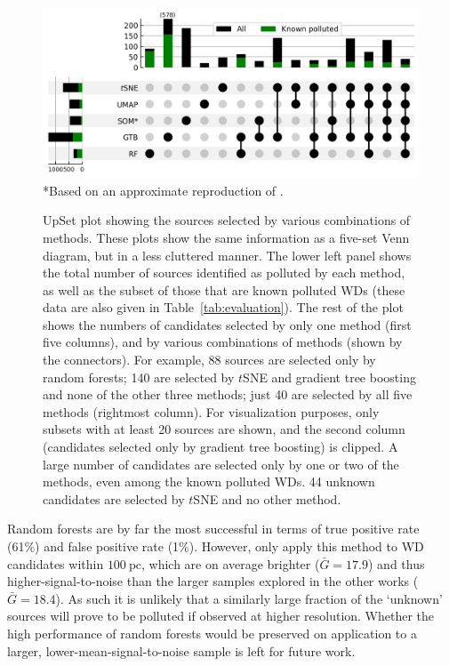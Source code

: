 \documentclass[fleqn,usenatbib]{rasti}
\begin{document}
\begin{figure}
\centering
\includegraphics[width=\textwidth]{figures/fig7_upset.png}
*Based on an approximate reproduction of \citet{perezcouto24}.
\caption{
    UpSet plot \citep{lex14} showing the sources selected by various combinations of methods.
    These plots show the same information as a five-set Venn diagram, but in a less cluttered manner.
    The lower left panel shows the total number of sources identified as polluted by each method, as well as the subset of those that are known polluted WDs (these data are also given in Table~\ref{tab:evaluation}).
    The rest of the plot shows the numbers of candidates selected by only one method (first five columns), and by various combinations of methods (shown by the connectors).
    For example, 88 sources are selected only by random forests; 140 are selected by $t$SNE and gradient tree boosting and none of the other three methods; just 40 are selected by all five methods (rightmost column).
    For visualization purposes, only subsets with at least 20 sources are shown, and the second column (candidates selected only by gradient tree boosting) is clipped.
    A large number of candidates are selected only by one or two of the methods, even among the known polluted WDs.
    44 unknown candidates are selected by $t$SNE and no other method.
}
\label{fig:overlap}
\end{figure}


Random forests are by far the most successful in terms of true positive rate (61\%) and false positive rate (1\%).
However, \citet{garciazamora23} only apply this method to WD candidates within $100~\text{pc}$, which are on average brighter ($\bar{\mathit{G}}=17.9$) and thus higher-signal-to-noise than the larger samples explored in the other works ($\bar{\mathit{G}}=18.4$).
As such it is unlikely that a similarly large fraction of the `unknown' sources will prove to be polluted if observed at higher resolution.
Whether the high performance of random forests would be preserved on application to a larger, lower-mean-signal-to-noise sample is left for future work.
\end{document}
